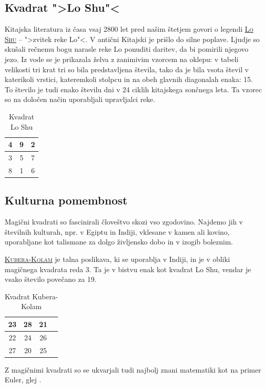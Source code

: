 \documentclass[a4paper,12pt]{article}
\newcommand{\pojem}[1]{\underline{\textsc{#1}}}
\newenvironment{magic}[3]{\begin{table}[!ht]
   \centering
   \caption{#2}
   \label{#3}
\begin{tabular}{|*{#1}{c|}}
\hline}{\end{tabular}\end{table}}
\theoremstyle{definition}
\theoremstyle{plain}
\begin{document}
\subsection{Kvadrat ">Lo Shu"<}

Kitajska literatura iz časa vsaj 2800 let pred našim štetjem govori o legendi
\pojem{Lo Shu} -- ">zvitek reke Lo"<. V antični Kitajski je prišlo do
silne poplave. Ljudje so skušali rečnemu bogu narasle reke Lo ponuditi daritev,
da bi pomirili njegovo jezo. Iz vode se je prikazala želva z zanimivim vzorcem
na oklepu: v tabeli velikosti tri krat tri so bila predstavljena števila, tako
da je bila vsota števil v katerikoli vrstici, kateremkoli stolpcu in na obeh
glavnih diagonalah enaka: 15. To število je tudi enako številu dni v 24 ciklih
kitajskega sončnega leta. Ta vzorec so na določen način uporabljali upravljalci
reke.

\begin{magic}{3}{Kvadrat Lo Shu}{table:loshu}
 4 & 9 & 2 \\ \hline
 3 & 5 & 7 \\ \hline
 8 & 1 & 6 \\ \hline
\end{magic}

\subsection{Kulturna pomembnost}

Magični kvadrati so fascinirali človeštvo skozi vso zgodovino. Najdemo jih
v številnih kulturah, npr. v Egiptu in Indiji, vklesane v kamen ali
kovino, uporabljane kot talismane za dolgo življensko dobo in v
izogib boleznim.

\pojem{Kubera-Kolam} je talna poslikava, ki se uporablja v Indiji, in je v
obliki magičnega kvadrata reda 3. Ta je v bistvu enak kot kvadrat
Lo Shu, vendar je vsako število povečano za 19.

\begin{magic}{4}{Kvadrat Kubera-Kolam}{table:kuberakolam}
  23 & 28 & 21 \\ \hline
  22 & 24 & 26 \\ \hline
  27 & 20 & 25 \\ \hline
\end{magic}
Z magičnimi kvadrati so se ukvarjali tudi najbolj znani matematiki kot na
primer Euler, glej \cite{euler}.

\end{document}

